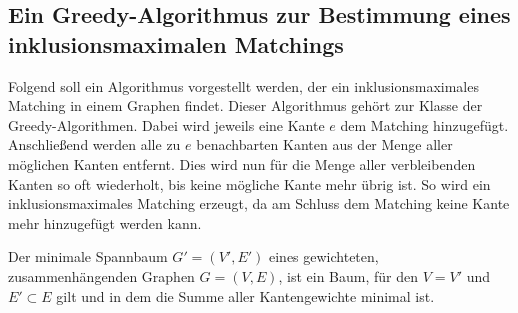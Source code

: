 \subsection{Ein Greedy-Algorithmus zur Bestimmung eines inklusionsmaximalen Matchings}
Folgend soll ein Algorithmus vorgestellt werden, der ein inklusionsmaximales Matching in einem Graphen findet. Dieser Algorithmus gehört zur Klasse der Greedy-Algorithmen. Dabei wird jeweils eine Kante $e$ dem Matching hinzugefügt. Anschließend werden alle zu $e$ benachbarten Kanten aus der Menge aller möglichen Kanten entfernt. Dies wird nun für die Menge aller verbleibenden Kanten so oft wiederholt, bis keine mögliche Kante mehr übrig ist. So wird ein inklusionsmaximales Matching erzeugt, da am Schluss dem Matching keine Kante mehr hinzugefügt werden kann.

\begin{df}
Der minimale Spannbaum $G'=(V',E')$ eines gewichteten, zusammenhängenden Graphen $G=(V,E)$, ist ein Baum, für den $V=V'$ und $E'\subset E$ gilt und in dem die Summe aller Kantengewichte minimal ist.
\end{df}

